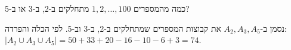 כמה מהמספרים $1,2,\dots,100$ מתחלקים ב-2, ב-3 או ב-5?
\begin{solbox}
נסמן ב-$A_2,A_3,A_5$ את קבוצות המספרים שמתחלקים ב-2, ב-3 וב-5. לפי הכלה והפרדה:
$|A_2\cup A_3\cup A_5|=50+33+20-16-10-6+3=74$.
\end{solbox}

